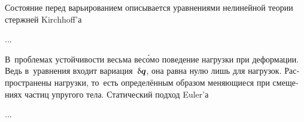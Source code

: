 

\begin{otherlanguage}{russian}

Состояние перед варьированием описывается уравнениями нелинейной теории стержней Kirchhoff’а

...



\end{otherlanguage}




\begin{otherlanguage}{russian}

В~проблемах устойчивости весьма вес\'{о}мо поведение нагрузки при деформации. Ведь в~уравнения входит вариация~${\updelta\hspace{-0.1ex}\bm{q}}$, она равна нулю лишь для  нагрузок. Распространены  нагрузки, то~есть определённым образом меняющиеся при смещениях частиц упругого тела. Статический подход Euler’а

...



\end{otherlanguage}



